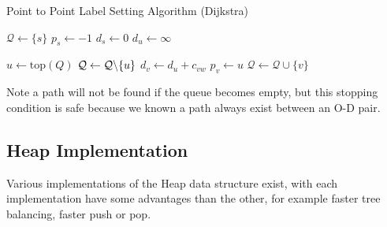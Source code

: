 \begin{algorithm}
    \caption{Point to Point Label Setting Algorithm (Dijkstra)}
    \begin{algorithmic}[1]
        \State $\mathcal{Q} \gets \{s\}$ 
        \State $p_s \gets -1$
        \State $d_s \gets 0$
         
            \State $d_u \gets \infty$
        \EndFor

            \State $ u \gets \text{top}(Q) $
            \State $ \mathcal{Q} \gets \mathcal{Q} \char`\\ \{u\} $
                \State {}
            \EndIf
             
                        \State $d_v \gets d_u + c_{vw}$
                        \State $p_v \gets u$
                        \State $\mathcal{Q} \gets \mathcal{Q} \cup \{v\}$
                    \EndIf
                \EndFor
            \EndIf
        \EndWhile
        \EndProcedure
    \end{algorithmic}
\end{algorithm}
Note a path will not be found if the queue becomes empty,
but this stopping condition is safe because we known a path
always exist between an O-D pair.


\subsection{Heap Implementation}
Various implementations of the Heap data structure exist,
with each implementation have some advantages than the other,
for example faster tree balancing, faster push or pop.

